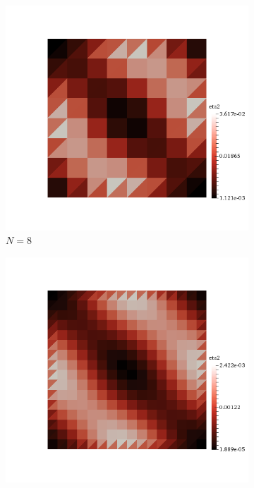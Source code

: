 \clearpage

\begin{figure}[h!]
  \centering
  \begin{subfigure}[b]{0.24\textwidth}
    \includegraphics[width=\textwidth,height=\textheight,keepaspectratio,height=\textheight,keepaspectratio]{figures/2_mpet/no_transfer/space/eta2_8.png}
    \caption{$N=8$}
  \end{subfigure}
  \begin{subfigure}[b]{0.24\textwidth}
    \includegraphics[width=\textwidth,height=\textheight,keepaspectratio,height=\textheight,keepaspectratio]{figures/2_mpet/no_transfer/space/eta2_16.png}

\end{subfigure}
\end{figure}
